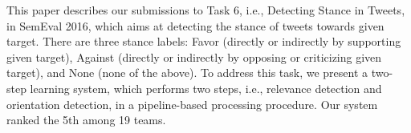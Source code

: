 This paper describes our submissions to Task 6, i.e., Detecting Stance in Tweets, in SemEval 2016, which aims at detecting the stance of tweets towards given target. There are three stance labels: Favor (directly or indirectly by supporting given target), Against (directly or indirectly by opposing or criticizing given target), and None (none of the above). To address this task, we present a two-step learning system, which performs two steps, i.e., relevance detection and orientation detection, in a pipeline-based processing procedure. Our system ranked the 5th among 19 teams.
